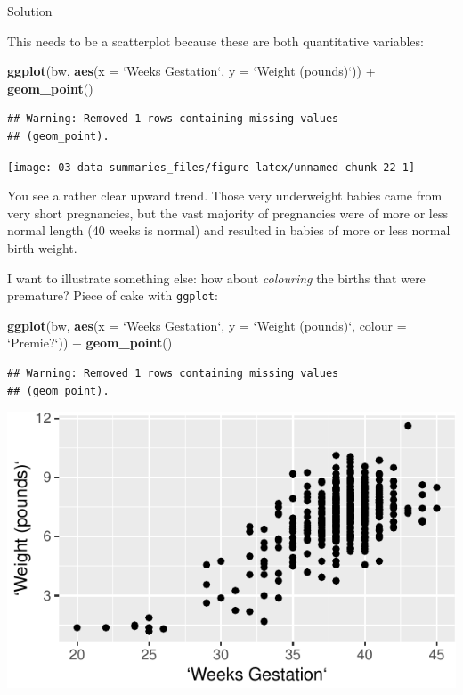 \documentclass[]{tufte-book}
\newenvironment{Shaded}{}{}
\newcommand{\DataTypeTok}[1]{\textcolor[rgb]{0.56,0.13,0.00}{#1}}
\newcommand{\KeywordTok}[1]{\textcolor[rgb]{0.00,0.44,0.13}{\textbf{#1}}}
\newcommand{\NormalTok}[1]{#1}
\newcommand{\OperatorTok}[1]{\textcolor[rgb]{0.40,0.40,0.40}{#1}}
\newcommand{\StringTok}[1]{\textcolor[rgb]{0.25,0.44,0.63}{#1}}
\theoremstyle{definition}
\theoremstyle{definition}
\theoremstyle{definition}
\theoremstyle{remark}
\begin{document}
Solution

This needs to be a scatterplot because these are both quantitative
variables:

\begin{Shaded}
\begin{Highlighting}[]
\KeywordTok{ggplot}\NormalTok{(bw, }\KeywordTok{aes}\NormalTok{(}\DataTypeTok{x =} \StringTok{`}\DataTypeTok{Weeks Gestation}\StringTok{`}\NormalTok{, }\DataTypeTok{y =} \StringTok{`}\DataTypeTok{Weight (pounds)}\StringTok{`}\NormalTok{)) }\OperatorTok{+}\StringTok{ }
\StringTok{    }\KeywordTok{geom_point}\NormalTok{()}
\end{Highlighting}
\end{Shaded}

\begin{verbatim}
## Warning: Removed 1 rows containing missing values
## (geom_point).
\end{verbatim}

\texttt{[image: 03-data-summaries\_files/figure-latex/unnamed-chunk-22-1]}

You see a rather clear upward trend. Those very underweight babies came
from very short pregnancies, but the vast majority of pregnancies were
of more or less normal length (40 weeks is normal) and resulted in
babies of more or less normal birth weight.

I want to illustrate something else: how about \emph{colouring} the
births that were premature? Piece of cake with \texttt{ggplot}:

\begin{Shaded}
\begin{Highlighting}[]
\KeywordTok{ggplot}\NormalTok{(bw, }\KeywordTok{aes}\NormalTok{(}\DataTypeTok{x =} \StringTok{`}\DataTypeTok{Weeks Gestation}\StringTok{`}\NormalTok{, }\DataTypeTok{y =} \StringTok{`}\DataTypeTok{Weight (pounds)}\StringTok{`}\NormalTok{, }
    \DataTypeTok{colour =} \StringTok{`}\DataTypeTok{Premie?}\StringTok{`}\NormalTok{)) }\OperatorTok{+}\StringTok{ }\KeywordTok{geom_point}\NormalTok{()}
\end{Highlighting}
\end{Shaded}

\begin{verbatim}
## Warning: Removed 1 rows containing missing values
## (geom_point).
\end{verbatim}

\includegraphics{03-data-summaries_files/figure-latex/unnamed-chunk-23-1}
\end{document}
